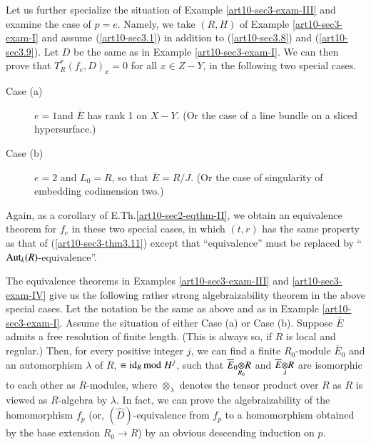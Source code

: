 \begin{romanexam}\label{art10-sec3-exam-IV}
Let us further specialize the situation of Example \ref{art10-sec3-exam-III} and examine the case of $p=e$. Namely, we take $(R,H)$ of Example \ref{art10-sec3-exam-I} and assume (\ref{art10-sec3.1}) in addition to (\ref{art10-sec3.8}) and (\ref{art10-sec3.9}). Let $D$ be the same as in Example \ref{art10-sec3-exam-I}. We can then prove that $T^{*}_{R}(f_{e},D)_{x}=0$ for all $x\in Z-Y$, in the following two special cases.
\end{romanexam}

\begin{description}
\item[Case (a)] $e=1$\pageoriginale and $\overline{E}$ has rank 1 on $X-Y$. (Or the case of a line bundle on a sliced hypersurface.)

\item[Case (b)] $e=2$ and $L_{0}=R$, so that $\overline{E}=R/J$. (Or the case of singularity of embedding codimension two.)
\end{description}
Again, as a corollary of E.Th.\ref{art10-sec2-eqthm-II}, we obtain an equivalence theorem for $f_{e}$ in these two special cases, in which $(t,r)$ has the same property as that of (\ref{art10-sec3-thm3.11}) except that ``equivalence'' must be replaced by ``$\operatorname{\mathrm{Aut}}_{k}(R)$-equivalence''.

\begin{remark}\label{art10-sec3-rem3.12}
The equivalence theorems in Examples \ref{art10-sec3-exam-III} and \ref{art10-sec3-exam-IV} give us the following rather strong algebraizability theorem in the above special cases. Let the notation be the same as above and as in Example \ref{art10-sec3-exam-I}. Assume the situation of either Case (a) or Case (b). Suppose $\overline{E}$ admits a free resolution of finite length. (This is always so, if $R$ is local and regular.) Then, for every positive integer $j$, we can find a finite $R_{0}$-module $\overline{E}_{0}$ and an automorphism $\lambda$ of $R$, $\equiv \operatorname{\mathrm{id}}_{R}{\rm{mod}}\kern.3em H^{j}$, such that $\foprod{\overline{E}_{0}}{R}{R_{0}}$ and $\foprod{\overline{E}}{R}{\lambda}$ are isomorphic to each other as $R$-modules, where $\otimes_{\lambda}$ denotes the tensor product over $R$ as $R$ is viewed as $R$-algebra by $\lambda$. In fact, we can prove the algebraizability of the homomorphism $f_{p}$ (or, $(\widehat{D})$-equivalence from $f_{p}$ to a homomorphism obtained by the base extension $R_{0}\to R$) by an obvious descending induction on $p$.
\end{remark}

